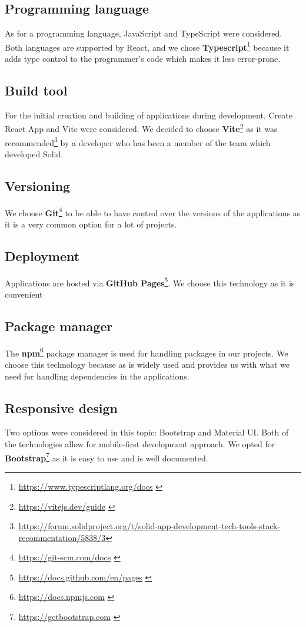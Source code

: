 \subsection*{Programming language}
As for a programming language, JavaScript and TypeScript were considered.
Both languages are supported by React, and we chose \textbf{Typescript}\footnote{\url{https://www.typescriptlang.org/docs}  \label{fnlabel}} because it adds type control to the programmer's code which makes it less error-prone.

\subsection*{Build tool}
For the initial creation and building of applications during development, Create React App and Vite were considered.
We decided to choose \textbf{Vite}\footnote{\url{https://vitejs.dev/guide}  \label{fnlabel}} as it was recommended\footnote{\url{https://forum.solidproject.org/t/solid-app-development-tech-tools-stack-recommentation/5838/3}} by a developer who has been a member of the team which developed Solid.

\subsection*{Versioning}
We choose \textbf{Git}\footnote{\url{https://git-scm.com/docs}  \label{fnlabel}} to be able to have control over the versions of the applications as it is a very common option for a lot of projects.

\subsection*{Deployment}
Applications are hosted via \textbf{GitHub Pages}\footnote{\url{https://docs.github.com/en/pages}  \label{fnlabel}}.
We choose this technology as it is convenient

\subsection*{Package manager}
The \textbf{npm}\footnote{\url{https://docs.npmjs.com} \label{fnlabel}} package manager is used for handling packages in our projects.
We choose this technology because as is widely used and provides us with what we need for handling dependencies in the applications.

\subsection*{Responsive design}
Two options were considered in this topic: Bootstrap and Material UI.
Both of the technologies allow for mobile-first development approach.
We opted for \textbf{Bootstrap}\footnote{\url{https://getbootstrap.com} \label{fnlabel}} as it is easy to use and is well documented.

